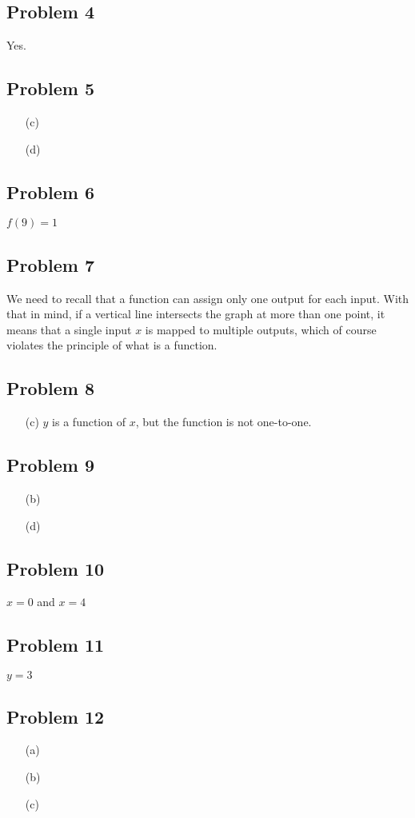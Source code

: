 \documentclass[12pt]{article}
\begin{document}
\subsection*{Problem 4}
Yes.
\subsection*{Problem 5}
\begin{enumerate}
    \item[(c)]
    \item[(d)]
\end{enumerate}
\subsection*{Problem 6}
\(f(9)=1\)
\subsection*{Problem 7}
We need to recall that a function can assign only one output for each input. With that in mind, if a vertical line intersects the graph at more than one point, it means that a single input \(x\) is mapped to multiple outputs, which of course violates the principle of what is a function.
\subsection*{Problem 8}
\begin{enumerate}
    \item[(c)] \( y \) is a function of \( x \), but the function is not one-to-one.
\end{enumerate}
\subsection*{Problem 9}
\begin{enumerate}
    \item[(b)]
    \item[(d)] 
\end{enumerate}
\subsection*{Problem 10}
\(x=0\) and \(x=4\)
\subsection*{Problem 11}
\(y=3\)
\subsection*{Problem 12}
\begin{enumerate}
    \item[(a)]
    \item[(b)]
    \item[(c)]
\end{enumerate}
\end{document}
